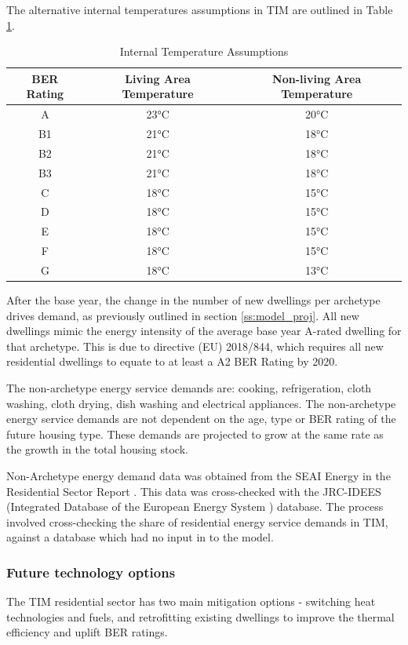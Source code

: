 \documentclass[journal abbreviation, manuscript]{copernicus}
\begin{document}
The alternative internal temperatures assumptions in TIM are outlined in Table \ref{Internal Temperature Assumptions}. 

\begin{table}[h!]
 \centering
 \footnotesize
 \caption{Internal Temperature Assumptions}
 \begin{tabular}{ccc}
 \hline 
 BER Rating & Living Area Temperature & Non-living Area Temperature \\
 \hline
 A & 23°C & 20°C \\
 B1 & 21°C & 18°C \\
 B2	& 21°C & 18°C \\
 B3 & 21°C & 18°C \\
 C & 18°C & 15°C \\
 D & 18°C & 15°C \\
 E & 18°C & 15°C \\
 F & 18°C & 15°C \\
 G & 18°C & 13°C \\ \hline
 \end{tabular}
 
 \label{Internal Temperature Assumptions}
\end{table}

After the base year, the change in the number of new dwellings per archetype drives demand, as previously outlined in section \ref{ss:model_proj}. All new dwellings mimic the energy intensity of the average base year A-rated dwelling for that archetype. This is due to directive (EU) 2018/844, which requires all new residential dwellings to equate to at least a A2 BER Rating by 2020. 

The non-archetype energy service demands are: cooking, refrigeration, cloth washing, cloth drying, dish washing and electrical appliances. The non-archetype energy service demands are not dependent on the age, type or BER rating of the future housing type. These demands are projected to grow at the same rate as the growth in the total housing stock. 

Non-Archetype energy demand data was obtained from the SEAI Energy in the Residential Sector Report \citep{SEAISustainableAuthorityofIreland2018}. This data was cross-checked with the JRC-IDEES (Integrated Database of the European Energy System ) database. The process involved cross-checking the share of residential energy service demands in TIM, against a database which had no input in to the model.

\subsubsection{Future technology options}
The TIM residential sector has two main mitigation options - switching heat technologies and fuels, and retrofitting existing dwellings to improve the thermal efficiency and uplift BER ratings. 
\end{document}
